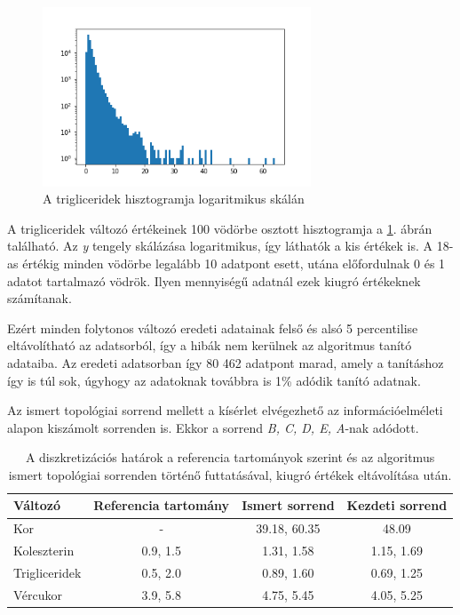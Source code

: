 \begin{figure}[htp]
    \centering
    \includegraphics[width=8cm]{figures/TGL_hist.png}
    \caption{A trigliceridek hisztogramja logaritmikus skálán}
    \label{fig:cardio_tgl_hist}
\end{figure}

A trigliceridek változó értékeinek 100 vödörbe osztott hisztogramja a \ref{fig:cardio_tgl_hist}. ábrán található. Az \emph{y} tengely skálázása logaritmikus, így láthatók a kis értékek is. A 18-as értékig minden vödörbe legalább 10 adatpont esett, utána előfordulnak 0 és 1 adatot tartalmazó vödrök. Ilyen mennyiségű adatnál ezek kiugró értékeknek számítanak.

Ezért minden folytonos változó eredeti adatainak felső és alsó 5 percentilise eltávolítható az adatsorból, így a hibák nem kerülnek az algoritmus tanító adataiba. Az eredeti adatsorban így 80 462 adatpont marad, amely a tanításhoz így is túl sok, úgyhogy az adatoknak továbbra is 1\% adódik tanító adatnak.

Az ismert topológiai sorrend mellett a kísérlet elvégezhető az információelméleti alapon kiszámolt sorrenden is. Ekkor a sorrend \emph{B, C, D, E, A}-nak adódott.

\begin{table}[htp]\centering
\begin{tabular}{lccc}
    Változó       & Referencia tartomány & Ismert sorrend & Kezdeti sorrend \\ \hline
    Kor           & -                    & 39.18, 60.35   & 48.09           \\
    Koleszterin   & 0.9, 1.5             & 1.31, 1.58     & 1.15, 1.69      \\
    Trigliceridek & 0.5, 2.0             & 0.89, 1.60     & 0.69, 1.25      \\
    Vércukor      & 3.9, 5.8             & 4.75, 5.45     & 4.05, 5.25
    \end{tabular}
    \caption{A diszkretizációs határok a referencia tartományok szerint és az algoritmus ismert topológiai sorrenden történő futtatásával, kiugró értékek eltávolítása után.}
    \label{tab:cardio_kiugro_ertek}
\end{table}

